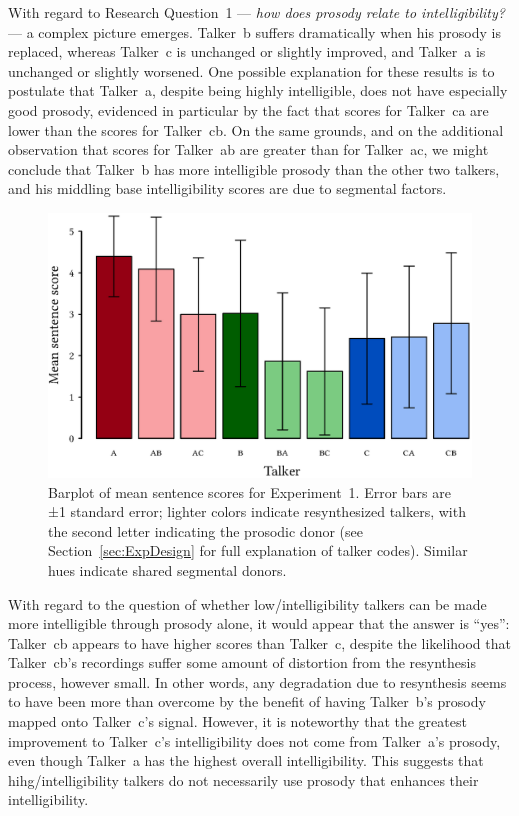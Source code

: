 With regard to Research Question~1 — \emph{how does prosody relate to intelligibility?} — a complex picture emerges.  Talker~\ac{b} suffers dramatically when his prosody is replaced, whereas Talker~\ac{c} is unchanged or slightly improved, and Talker~\ac{a} is unchanged or slightly worsened.  One possible explanation for these results is to postulate that Talker~\ac{a}, despite being highly intelligible, does not have especially good prosody, evidenced in particular by the fact that scores for Talker~\ac{ca} are lower than the scores for Talker~\ac{cb}.  On the same grounds, and on the additional observation that scores for Talker~\ac{ab} are greater than for Talker~\ac{ac}, we might conclude that Talker~\ac{b} has more intelligible prosody than the other two talkers, and his middling base intelligibility scores are due to segmental factors.

\begin{figure}[bt]
	\begin{centering}
	\includegraphics{figures/results/ExpOneBarplot.eps}
	\caption[Barplot of mean sentence scores for Experiment~1]{Barplot of mean sentence scores for Experiment~1.  Error bars are ±1 standard error; lighter colors indicate resynthesized talkers, with the second letter indicating the prosodic donor (see Section~\ref{sec:ExpDesign} for full explanation of talker codes).  Similar hues indicate shared segmental donors.\label{fig:ExpOneBarplot}}
	\end{centering}
\end{figure}

With regard to the question of whether low\-/intelligibility talkers can be made more intelligible through prosody alone, it would appear that the answer is “yes”: Talker~\ac{cb} appears to have higher scores than Talker~\ac{c}, despite the likelihood that Talker~\ac{cb}’s recordings suffer some amount of distortion from the resynthesis process, however small.  In other words, any degradation due to resynthesis seems to have been more than overcome by the benefit of having Talker~\ac{b}’s prosody mapped onto Talker~\ac{c}’s signal.  However, it is noteworthy that the greatest improvement to Talker~\ac{c}’s intelligibility does not come from Talker~\ac{a}’s prosody, even though Talker~\ac{a} has the highest overall intelligibility.  This suggests that hihg\-/intelligibility talkers do not necessarily use prosody that enhances their intelligibility.

